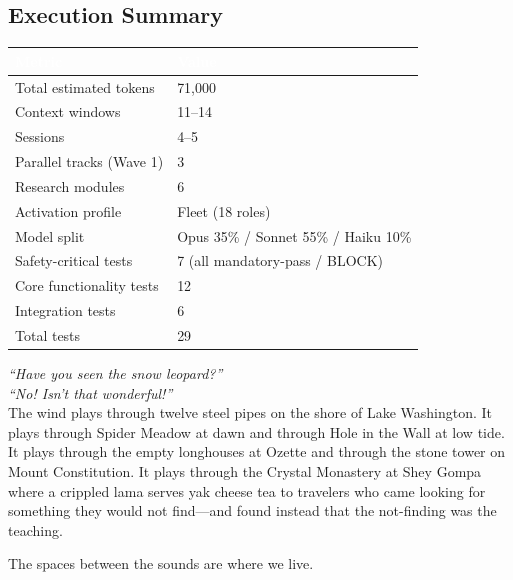 \documentclass[11pt,letterpaper]{article}
\newcommand{\tableheader}[1]{\textbf{\sffamily\textcolor{white}{#1}}}
\begin{document}
\subsection{Execution Summary}

\begin{center}
\begin{tabularx}{\textwidth}{L{5cm}X}
\toprule
{}
\tableheader{Metric} & \tableheader{Value} \\
\midrule
Total estimated tokens & 71,000 \\
Context windows & 11--14 \\
Sessions & 4--5 \\
Parallel tracks (Wave 1) & 3 \\
Research modules & 6 \\
Activation profile & Fleet (18 roles) \\
Model split & Opus 35\% / Sonnet 55\% / Haiku 10\% \\
Safety-critical tests & 7 (all mandatory-pass / BLOCK) \\
Core functionality tests & 12 \\
Integration tests & 6 \\
Total tests & 29 \\
\bottomrule
\end{tabularx}
\end{center}

\vspace{1cm}

\begin{quotebox}
\textit{``Have you seen the snow leopard?''} \\
\textit{``No! Isn't that wonderful!''} \\[0.5em]
The wind plays through twelve steel pipes on the shore of Lake Washington. It plays through Spider Meadow at dawn and through Hole in the Wall at low tide. It plays through the empty longhouses at Ozette and through the stone tower on Mount Constitution. It plays through the Crystal Monastery at Shey Gompa where a crippled lama serves yak cheese tea to travelers who came looking for something they would not find---and found instead that the not-finding was the teaching.

The spaces between the sounds are where we live.
\end{quotebox}
\end{document}
